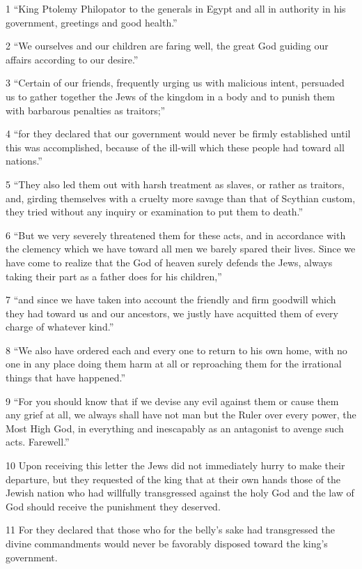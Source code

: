 \par 1 “King Ptolemy Philopator to the generals in Egypt and all in authority in his government, greetings and good health.”
\par 2 “We ourselves and our children are faring well, the great God guiding our affairs according to our desire.”
\par 3 “Certain of our friends, frequently urging us with malicious intent, persuaded us to gather together the Jews of the kingdom in a body and to punish them with barbarous penalties as traitors;”
\par 4 “for they declared that our government would never be firmly established until this was accomplished, because of the ill-will which these people had toward all nations.”
\par 5 “They also led them out with harsh treatment as slaves, or rather as traitors, and, girding themselves with a cruelty more savage than that of Scythian custom, they tried without any inquiry or examination to put them to death.”
\par 6 “But we very severely threatened them for these acts, and in accordance with the clemency which we have toward all men we barely spared their lives. Since we have come to realize that the God of heaven surely defends the Jews, always taking their part as a father does for his children,”
\par 7 “and since we have taken into account the friendly and firm goodwill which they had toward us and our ancestors, we justly have acquitted them of every charge of whatever kind.”
\par 8 “We also have ordered each and every one to return to his own home, with no one in any place doing them harm at all or reproaching them for the irrational things that have happened.”
\par 9 “For you should know that if we devise any evil against them or cause them any grief at all, we always shall have not man but the Ruler over every power, the Most High God, in everything and inescapably as an antagonist to avenge such acts. Farewell.”
\par 10 Upon receiving this letter the Jews did not immediately hurry to make their departure, but they requested of the king that at their own hands those of the Jewish nation who had willfully transgressed against the holy God and the law of God should receive the punishment they deserved.
\par 11 For they declared that those who for the belly's sake had transgressed the divine commandments would never be favorably disposed toward the king's government.
